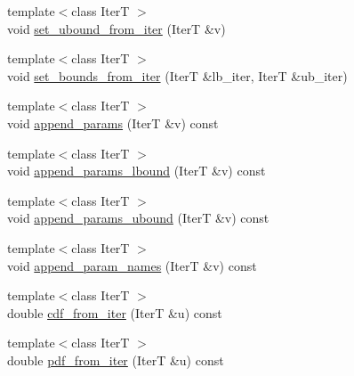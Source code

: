\begin{DoxyCompactItemize}
\item 
{\footnotesize template$<$class IterT $>$ }\\void \hyperlink{classprior__hessian_1_1CompositeDist_1_1ComponentDistAdaptor_3_01Dist_00_01meta_1_1EnableIfSubcld67d34d533dbae21b9dad35557546eec_a0a6b7d97151496abdecc737368a980ab}{set\+\_\+ubound\+\_\+from\+\_\+iter} (IterT \&v)
\item 
{\footnotesize template$<$class IterT $>$ }\\void \hyperlink{classprior__hessian_1_1CompositeDist_1_1ComponentDistAdaptor_3_01Dist_00_01meta_1_1EnableIfSubcld67d34d533dbae21b9dad35557546eec_a2eda163908ce9d7dc56d2c329b888ad0}{set\+\_\+bounds\+\_\+from\+\_\+iter} (IterT \&lb\+\_\+iter, IterT \&ub\+\_\+iter)
\item 
{\footnotesize template$<$class IterT $>$ }\\void \hyperlink{classprior__hessian_1_1CompositeDist_1_1ComponentDistAdaptor_3_01Dist_00_01meta_1_1EnableIfSubcld67d34d533dbae21b9dad35557546eec_a4b45af315fe88daef877ec564b33272a}{append\+\_\+params} (IterT \&v) const 
\item 
{\footnotesize template$<$class IterT $>$ }\\void \hyperlink{classprior__hessian_1_1CompositeDist_1_1ComponentDistAdaptor_3_01Dist_00_01meta_1_1EnableIfSubcld67d34d533dbae21b9dad35557546eec_a64e6803674abdc614ed57a9dd00626e4}{append\+\_\+params\+\_\+lbound} (IterT \&v) const 
\item 
{\footnotesize template$<$class IterT $>$ }\\void \hyperlink{classprior__hessian_1_1CompositeDist_1_1ComponentDistAdaptor_3_01Dist_00_01meta_1_1EnableIfSubcld67d34d533dbae21b9dad35557546eec_af400da8d0de6fd2436fbb4a4ccb52077}{append\+\_\+params\+\_\+ubound} (IterT \&v) const 
\item 
{\footnotesize template$<$class IterT $>$ }\\void \hyperlink{classprior__hessian_1_1CompositeDist_1_1ComponentDistAdaptor_3_01Dist_00_01meta_1_1EnableIfSubcld67d34d533dbae21b9dad35557546eec_a500e09e7f9b4431f7db471bf075cdce2}{append\+\_\+param\+\_\+names} (IterT \&v) const 
\item 
{\footnotesize template$<$class IterT $>$ }\\double \hyperlink{classprior__hessian_1_1CompositeDist_1_1ComponentDistAdaptor_3_01Dist_00_01meta_1_1EnableIfSubcld67d34d533dbae21b9dad35557546eec_a95dcfc035379172432e5ce0c585c38c2}{cdf\+\_\+from\+\_\+iter} (IterT \&u) const 
\item 
{\footnotesize template$<$class IterT $>$ }\\double \hyperlink{classprior__hessian_1_1CompositeDist_1_1ComponentDistAdaptor_3_01Dist_00_01meta_1_1EnableIfSubcld67d34d533dbae21b9dad35557546eec_a845f23119e7f1afee29d6f29f9b0edf1}{pdf\+\_\+from\+\_\+iter} (IterT \&u) const 

\end{DoxyCompactItemize}
